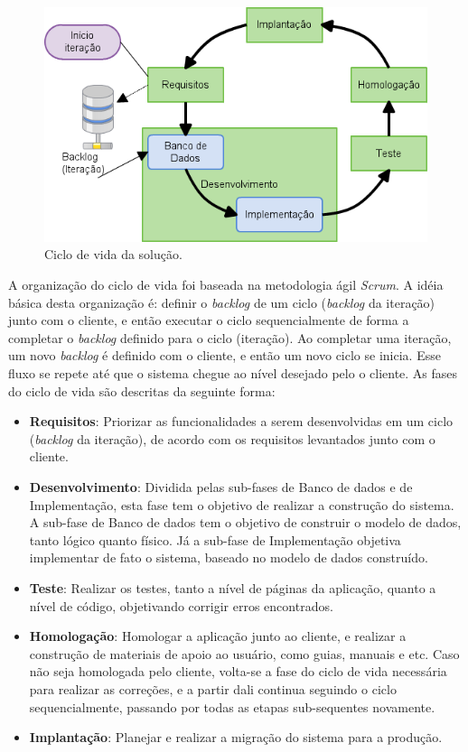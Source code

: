 \begin{figure}[!htb]
	\centering
		\includegraphics[scale=0.8]{figuras/ciclo_vida_solucao}
	\caption{Ciclo de vida da solução.}
\end{figure}

A organização do ciclo de vida foi baseada na metodologia ágil \textit{Scrum}. A idéia básica desta organização é: definir o \textit{backlog} de um ciclo (\textit{backlog} da iteração) junto com o cliente, e então executar o ciclo sequencialmente de forma a completar o \textit{backlog} definido para o ciclo (iteração). Ao completar uma iteração, um novo \textit{backlog} é definido com o cliente, e então um novo ciclo se inicia. Esse fluxo se repete até que o sistema chegue ao nível desejado pelo o cliente. As fases do ciclo de vida são descritas da seguinte forma:

\begin{itemize}
\item \textbf{Requisitos}: Priorizar as funcionalidades a serem desenvolvidas em um ciclo (\textit{backlog} da iteração), de acordo com os requisitos levantados junto com o cliente.
\item \textbf{Desenvolvimento}: Dividida pelas sub-fases de Banco de dados e de Implementação, esta fase tem o objetivo de realizar a construção do sistema. A sub-fase de Banco de dados tem o objetivo de construir o modelo de dados, tanto lógico quanto físico. Já a sub-fase de Implementação objetiva implementar de fato o sistema, baseado no modelo de dados construído.
\item \textbf{Teste}: Realizar os testes, tanto a nível de páginas da aplicação, quanto a nível de código, objetivando corrigir erros encontrados.
\item \textbf{Homologação}: Homologar a aplicação junto ao cliente, e realizar a construção de materiais de apoio ao usuário, como guias, manuais e etc. Caso não seja homologada pelo cliente, volta-se a fase do ciclo de vida necessária para realizar as correções, e a partir dali continua seguindo o ciclo sequencialmente, passando por todas as etapas sub-sequentes novamente.
\item \textbf{Implantação}: Planejar e realizar a migração do sistema para a produção.
\end{itemize}


